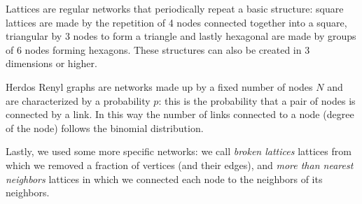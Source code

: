 Lattices are regular networks that periodically repeat a basic structure: square lattices are made by the repetition of 4 nodes connected together into a square, triangular by 3 nodes to form a triangle and lastly hexagonal are made by groups of 6 nodes forming hexagons. These structures can also be created in 3 dimensions or higher.

Herdos Renyl graphs are networks made up by a fixed number of nodes $N$ and are characterized by a probability $p$: this is the probability that a pair of nodes is connected by a link. In this way the number of links connected to a node (degree of the node) follows the binomial distribution.

Lastly, we used some more specific networks: we call \emph{broken lattices} lattices from which we removed a fraction of vertices (and their edges), and \emph{more than nearest neighbors} lattices in which we connected each node to the neighbors of its neighbors.


